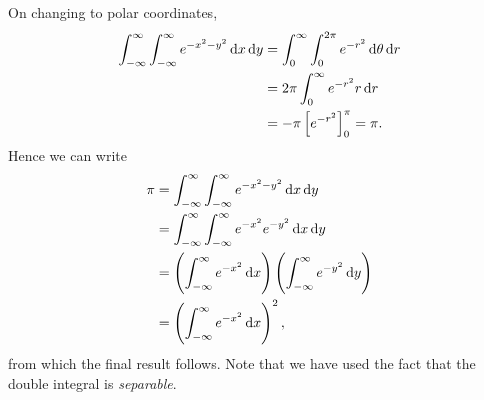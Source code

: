\begin{solution}
On changing to polar coordinates,
\begin{align*}
\int_{-\infty}^{\infty}\int_{-\infty}^{\infty}e^{-x^2-y^2}\dd{x}\dd{y}
&=\int_{0}^{\infty}\int_{0}^{2\pi}e^{-r^2}\dd{\theta}\dd{r}\\
&=2\pi\int_{0}^{\infty}e^{-r^2}r\dd{r}\\
&=-\pi\left[e^{-r^2}\right]_{0}^{\pi}=\pi.
\end{align*}
Hence we can write
\begin{align*}
\pi&=\int_{-\infty}^{\infty}\int_{-\infty}^{\infty}e^{-x^2-y^2}\dd{x}\dd{y}\\
&=\int_{-\infty}^{\infty}\int_{-\infty}^{\infty}e^{-x^2}e^{-y^2}\dd{x}\dd{y}\\
&=\left(\int_{-\infty}^{\infty}e^{-x^2}\dd{x}\right)\left(\int_{-\infty}^{\infty}e^{-y^2}\dd{y}\right)\\
&=\left(\int_{-\infty}^{\infty}e^{-x^2}\dd{x}\right)^2,
\end{align*}
from which the final result follows. Note that we have used the fact that the double integral is \emph{separable}.
\end{solution}